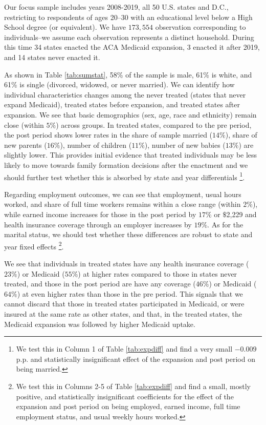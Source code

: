 \documentclass{article}
\begin{document}
Our focus sample includes years 2008-2019, all 50 U.S. states and D.C., restricting to respondents of ages 20--30 with an educational level below a High School degree (or equivalent). We have $173,554$ observation corresponding to individuals--we assume each observation represents a distinct household. During this time 34 states enacted the ACA Medicaid expansion, 3 enacted it after 2019, and 14 states never enacted it.

As shown in Table \ref{tab:sumstat}, 58\% of the sample is male, 61\% is white, and 61\% is single (divorced, widowed, or never married). We can identify how individual characteristics changes among the never treated (states that never expand Medicaid), treated states before expansion, and treated states after expansion. We see that basic demographics (sex, age, race and ethnicity) remain close (within $5\%$) across groups. In treated states, compared to the pre period, the post period shows lower rates in the share of sample married ($14\%$), share of new parents ($16\%$), number of children ($11\%$), number of new babies ($13\%$) are slightly lower. This provides initial evidence that treated individuals may be less likely to move towards family formation decisions after the enactment and we should further test whether this is absorbed by state and year differentials \footnote{We test this in Column 1 of Table \ref{tab:expdiff} and find a very small $-0.009$ p.p. and statistically insignificant effect of the expansion and post period on being married.}.

Regarding employment outcomes, we can see that employment, usual hours worked, and share of full time workers remains within a close range (within $2\%$), while earned income increases for those in the post period by $17\%$ or $\$$2,229 and health insurance coverage through an employer increases by $19\%$. As for the marital status, we should test whether these differences are robust to state and year fixed effects \footnote{We test this in Columns 2-5 of Table \ref{tab:expdiff} and find a small, mostly positive, and statistically insignificant coefficients for the effect of the expansion and post period on being employed, earned income, full time employment status, and usual weekly hours worked. }.


We see that individuals in treated states have any health insurance coverage ($23\%$) or Medicaid ($55\%$) at higher rates compared to those in states never treated, and those in the post period are have any coverage ($46\%$) or Medicaid ($64\%$) at even higher rates than those in the pre period. This signals that we cannot discard that those in treated states participated in Medicaid, or were insured at the same rate as other states, and that, in the treated states, the Medicaid expansion was followed by higher Medicaid uptake. %
\end{document}
